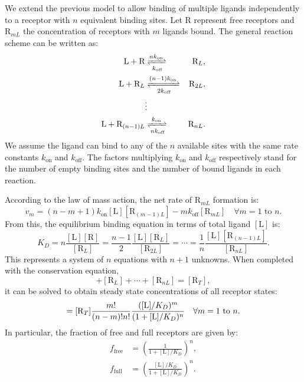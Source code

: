 We extend the previous model to allow binding of multiple ligands independently to a receptor with $n$ equivalent binding sites. Let $\text{R}$ represent free receptors and $\text{R}_{mL}$ the concentration of receptors with $m$ ligands bound. The general reaction scheme can be written as:
\begin{align}
	\text{L} + \text{R} & \xrightleftharpoons[k_\text{off}]{n k_\text{on}} & \text{R}_L, \label{eq:24.07}\\
	\text{L} + \text{R}_L & \xrightleftharpoons[2k_\text{off}]{(n-1) k_\text{on}} & \text{R}_{2L}, \label{eq:24.08}\\
    & \vdots & \nonumber \\
	\text{L} + \text{R}_{(n-1)L} & \xrightleftharpoons[n k_\text{off}]{k_\text{on}} & \text{R}_{nL}. \label{eq:24.09}
\end{align}
We assume the ligand can bind to any of the $n$ available sites with the same rate constants $k_\text{on}$ and $k_\text{off}$. The factors multiplying $k_\text{on}$ and $k_\text{off}$ respectively stand for the number of empty binding sites and the number of bound ligands in each reaction.  

According to the law of mass action, the net rate of $\text{R}_{mL}$ formation is:
\begin{equation*}
	v_m = (n-m+1) k_\text{on}[\text{L}][\text{R}_{(m-1)L}]- m k_\text{off}[\text{R}_{mL}] \quad \forall m=1 \text{ to } n.
\end{equation*}
From this, the equilibrium binding equation in terms of total ligand $[\text{L}]$ is:
\begin{equation*}
K_D = n \frac{[\text{L}][\text{R}]}{[\text{R}_L]} = \frac{n-1}{2} \frac{[\text{L}][\text{R}_L]}{[\text{R}_{2L}]} = \cdots = \frac{1}{n}\frac{[\text{L}][\text{R}_{(n-1)L}]}{[\text{R}_{nL}]}.
\end{equation*}
This represents a system of $n$ equations with $n+1$ unknowns. When completed with the conservation equation,
\begin{equation*}
    [\text{R}] + [\text{R}_L] + \cdots + [\text{R}_{nL}] = [\text{R}_T],
\end{equation*}
it can be solved to obtain steady state concentrations of all receptor states:
\begin{equation*}
    [\text{R}_{mL}] = [\text{R}_T] \frac{m!}{(n-m)! n!}\frac{([\text{L}]/K_D)^m}{(1 + \text{[\text{L}]}/K_D)^n} \quad \forall m=1 \text{ to } n.
\end{equation*}
In particular, the fraction of free and full receptors are given by:
\begin{align*}
    f_{\text{free}} & = \left(\frac{1}{1 + [\text{L}]/K_D}\right)^n, \\
    f_{\text{full}} & = \left(\frac{[\text{L}]/K_D}{1 + [\text{L}]/K_D}\right)^n.
\end{align*}

